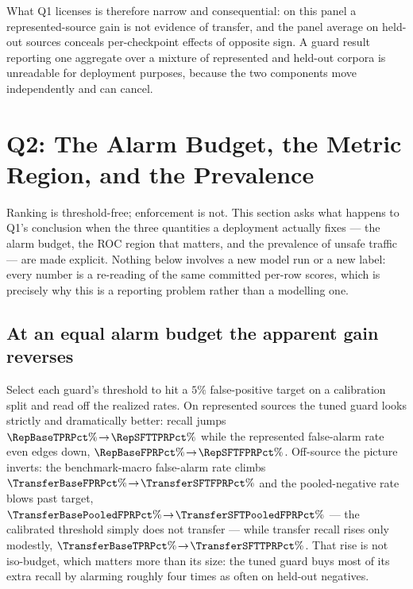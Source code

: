 \documentclass[manuscript,screen,review,anonymous]{acmart}
\begin{document}
What Q1 licenses is therefore narrow and consequential: on this panel a represented-source gain is not
evidence of transfer, and the panel average on held-out sources conceals per-checkpoint effects of
opposite sign. A guard result reporting one aggregate over a mixture of represented and held-out corpora
is unreadable for deployment purposes, because the two components move independently and can cancel.

\section{Q2: The Alarm Budget, the Metric Region, and the Prevalence}
\label{sec:finding-operational}

Ranking is threshold-free; enforcement is not. This section asks what happens to Q1's conclusion when
the three quantities a deployment actually fixes --- the alarm budget, the ROC region that matters, and
the prevalence of unsafe traffic --- are made explicit. Nothing below involves a new model run or a new
label: every number is a re-reading of the same committed per-row scores, which is precisely why this is
a reporting problem rather than a modelling one.

\subsection{At an equal alarm budget the apparent gain reverses}
\label{sec:budget}

Select each guard's threshold to hit a $5\%$ false-positive target on a calibration split and read off
the realized rates. On represented sources the tuned guard looks strictly and dramatically better:
recall jumps $\RepBaseTPRPct\%\!\rightarrow\!\RepSFTTPRPct\%$ while the represented false-alarm rate
even edges down, $\RepBaseFPRPct\%\!\rightarrow\!\RepSFTFPRPct\%$. Off-source the picture inverts: the
benchmark-macro false-alarm rate climbs
$\TransferBaseFPRPct\%\!\rightarrow\!\TransferSFTFPRPct\%$ and the pooled-negative rate blows past
target, $\TransferBasePooledFPRPct\%\!\rightarrow\!\TransferSFTPooledFPRPct\%$ --- the calibrated
threshold simply does not transfer --- while transfer recall rises only modestly,
$\TransferBaseTPRPct\%\!\rightarrow\!\TransferSFTTPRPct\%$. That rise is not iso-budget, which matters
more than its size: the tuned guard buys most of its extra recall by alarming roughly four times as
often on held-out negatives.
\end{document}
